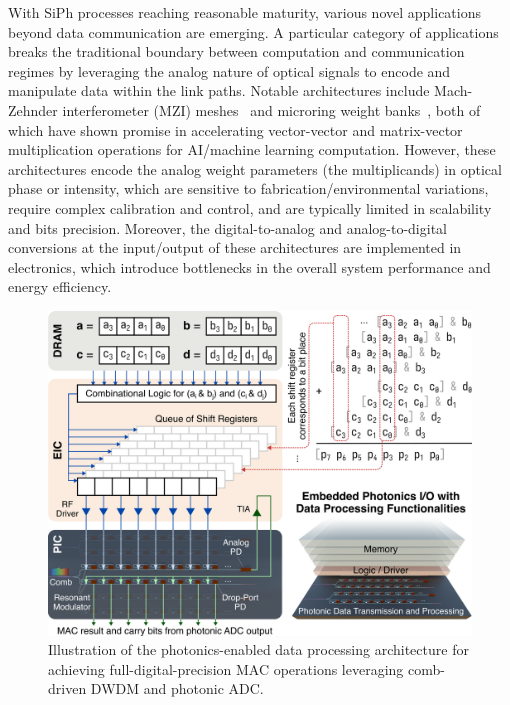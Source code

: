 With SiPh processes reaching reasonable maturity, various novel applications beyond data communication are emerging. A particular category of applications breaks the traditional boundary between computation and communication regimes by leveraging the analog nature of optical signals to encode and manipulate data within the link paths. Notable architectures include Mach-Zehnder interferometer (MZI) meshes~\cite{shenDeepLearningCoherent2017} and microring weight banks~\cite{taitMicroringWeightBanks2016}, both of which have shown promise in accelerating vector-vector and matrix-vector multiplication operations for AI/machine learning computation. However, these architectures encode the analog weight parameters (the multiplicands) in optical phase or intensity, which are sensitive to fabrication/environmental variations, require complex calibration and control, and are typically limited in scalability and bits precision. Moreover, the digital-to-analog and analog-to-digital conversions at the input/output of these architectures are implemented in electronics, which introduce bottlenecks in the overall system performance and energy efficiency.



\begin{figure}
    \vspace{-1em}
    \begin{center}
        \includegraphics[width=\linewidth]{../../6_figures/rs_fig_3_comppho.png}
    \end{center}
    \caption{Illustration of the photonics-enabled data processing architecture for achieving full-digital-precision MAC operations leveraging comb-driven DWDM and photonic ADC.}
    \label{fig:pho_computing}
    \vspace{-0.5em}
\end{figure}

